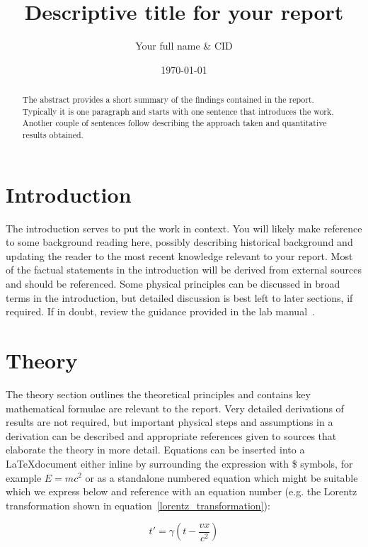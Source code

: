 \documentclass{article}
\title{Descriptive title for your report}
\author{ Your full name \& CID }
\date{\today}
\begin{document}
\maketitle


\begin{abstract}
The abstract provides a short summary of the findings contained in the report.  Typically it is one paragraph and starts with one sentence that introduces the work.  Another couple of sentences follow describing the approach taken and quantitative results obtained. 
\end{abstract}

\section{Introduction}
The introduction serves to put the work in context.  You will likely make reference to some background reading here, possibly describing historical background and updating the reader to the most recent knowledge relevant to your report.  Most of the factual statements in the introduction will be derived from external sources and should be referenced.  Some physical principles can be discussed in broad terms in the introduction, but detailed discussion is best left to later sections, if required.   If in doubt, review the guidance provided in the lab manual~\cite{lab_manual}.

\section{Theory}

The theory section outlines the theoretical principles and contains key mathematical formulae are relevant to the report.  Very detailed derivations of results are not required, but important physical steps and assumptions in a derivation can be described and appropriate references given to sources that elaborate the theory in more detail.   
Equations can be inserted into a \LaTeX document either inline by surrounding the expression with \$ symbols, for example $E=mc^{2}$ or as a standalone numbered equation which might be suitable which we express below and reference with an equation number (e.g. the Lorentz transformation shown in equation~\ref{lorentz_transformation}):

\begin{equation}
t' = \gamma \left ( t- \frac{v x}{c^{2}} \right )
\label{lorentz_transformation}
\end{equation}
\end{document}
